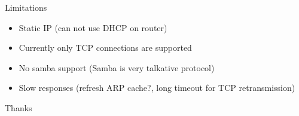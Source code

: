 \documentclass{beamer}
\begin{document}
\begin{frame}{Limitations}
    \begin{itemize}
        \item<1-> Static IP (can not use DHCP on router)
        \item<2-> Currently only TCP connections are supported
        \item<3-> No samba support (Samba is very talkative protocol)
        \item<4-> Slow responses (refresh ARP cache?, long timeout for TCP retransmission)
    \end{itemize}
\end{frame}

\begin{frame} {Thanks}
\end{frame}
\end{document}
